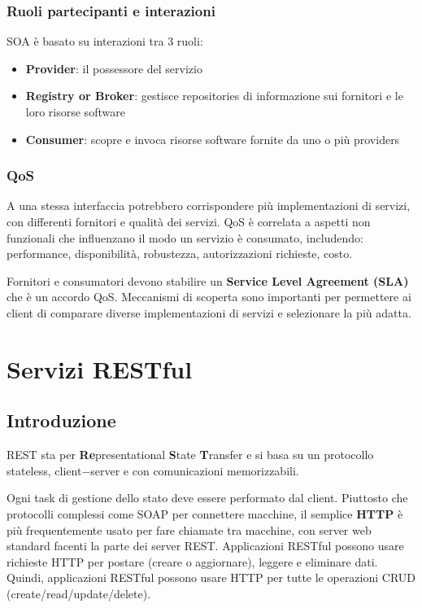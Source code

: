 \subsection{Ruoli partecipanti e interazioni}
SOA è basato su interazioni tra 3 ruoli:
\begin{itemize}
    \item \textbf{Provider}: il possessore del servizio
    \item \textbf{Registry or Broker}: gestisce repositories di informazione sui fornitori e le loro risorse software
    \item \textbf{Consumer}: scopre e invoca risorse software fornite da uno o più providers
\end{itemize}

\subsection{QoS}
A una stessa interfaccia potrebbero corrispondere più implementazioni di servizi, con differenti fornitori e qualità dei servizi. QoS è correlata a aspetti non funzionali che influenzano il modo un servizio è consumato, includendo: performance, disponibilità, robustezza, autorizzazioni richieste, costo. 

Fornitori e consumatori devono stabilire un \textbf{Service Level Agreement (SLA)} che è un accordo QoS. Meccanismi di scoperta sono importanti per permettere ai client di comparare diverse implementazioni di servizi e selezionare la più adatta. 


\chapter{Servizi RESTful}
\section{Introduzione}
REST sta per \textbf{Re}presentational \textbf{S}tate \textbf{T}ransfer e si basa su un protocollo stateless, client$-$server e con comunicazioni memorizzabili. 

Ogni task di gestione dello stato deve essere performato dal client. Piuttosto che protocolli complessi come SOAP per connettere macchine, il semplice \textbf{HTTP} è più frequentemente usato per fare chiamate tra macchine, con server web standard facenti la parte dei server REST. Applicazioni RESTful possono usare richieste HTTP per postare (creare o aggiornare), leggere e eliminare dati. Quindi, applicazioni RESTful possono usare HTTP per tutte le operazioni CRUD (create/read/update/delete). \\

